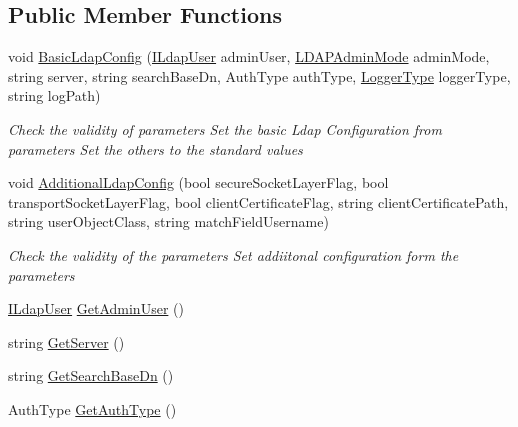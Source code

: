 \subsection*{Public Member Functions}
\begin{DoxyCompactItemize}
\item 
void \hyperlink{interface_l_d_a_p_library_1_1_interfarces_1_1_i_ldap_config_repository_a02e4f8f798a2884f47eac5a194ea89c4}{Basic\+Ldap\+Config} (\hyperlink{interface_l_d_a_p_library_1_1_interfarces_1_1_i_ldap_user}{I\+Ldap\+User} admin\+User, \hyperlink{namespace_l_d_a_p_library_1_1_enums_aaaf5c3ff906b84752d719f58d502f15e}{L\+D\+A\+P\+Admin\+Mode} admin\+Mode, string server, string search\+Base\+Dn, Auth\+Type auth\+Type, \hyperlink{namespace_l_d_a_p_library_1_1_logger_a398123fc2bb2443d0e0821044d077795}{Logger\+Type} logger\+Type, string log\+Path)
\begin{DoxyCompactList}\small\item\em Check the validity of parameters Set the basic Ldap Configuration from parameters Set the others to the standard values \end{DoxyCompactList}\item 
void \hyperlink{interface_l_d_a_p_library_1_1_interfarces_1_1_i_ldap_config_repository_a3ba23f03d9f9a005f578d0e554d1a3dd}{Additional\+Ldap\+Config} (bool secure\+Socket\+Layer\+Flag, bool transport\+Socket\+Layer\+Flag, bool client\+Certificate\+Flag, string client\+Certificate\+Path, string user\+Object\+Class, string match\+Field\+Username)
\begin{DoxyCompactList}\small\item\em Check the validity of the parameters Set addiitonal configuration form the parameters \end{DoxyCompactList}\item 
\hyperlink{interface_l_d_a_p_library_1_1_interfarces_1_1_i_ldap_user}{I\+Ldap\+User} \hyperlink{interface_l_d_a_p_library_1_1_interfarces_1_1_i_ldap_config_repository_abc93789c2f541a07bb5f0200484c7450}{Get\+Admin\+User} ()
\item 
string \hyperlink{interface_l_d_a_p_library_1_1_interfarces_1_1_i_ldap_config_repository_a5c70eefce4b989717725c3fa37ee9982}{Get\+Server} ()
\item 
string \hyperlink{interface_l_d_a_p_library_1_1_interfarces_1_1_i_ldap_config_repository_a5844821d9f540b8bff52faa61231009b}{Get\+Search\+Base\+Dn} ()
\item 
Auth\+Type \hyperlink{interface_l_d_a_p_library_1_1_interfarces_1_1_i_ldap_config_repository_a9848877d9e19a28908e1ada8abf563d7}{Get\+Auth\+Type} ()

\end{DoxyCompactItemize}
